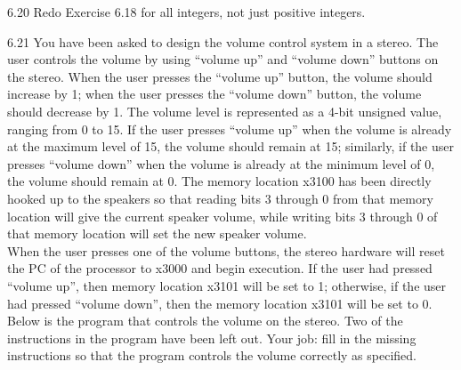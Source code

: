 \documentclass{patt}
\begin{document}
\begin{exercises}
\item[6.20] Redo Exercise 6.18 for all integers, not just positive integers.

\item[6.21] You have been asked to design the volume control system in a stereo. The user controls the volume by using “volume up” and “volume down” buttons on the stereo. When the user presses the “volume up” button, the volume should increase by 1; when the user presses the “volume down” button, the volume should decrease by 1. The volume level is represented as a 4-bit unsigned value, ranging from 0 to 15. If the user presses “volume up” when the volume is already at the maximum level of 15, the volume should remain at 15; similarly, if the user presses “volume down” when the volume is already at the minimum level of 0, the volume should remain at 0. The memory location x3100 has been directly hooked up to the speakers so that reading bits 3 through 0 from that memory location will give the current speaker volume, while writing bits 3 through 0 of that memory location will set the new speaker volume. \\

\noindent
When the user presses one of the volume buttons, the stereo hardware will reset the PC of the processor to x3000 and begin execution. If the user had pressed “volume up”, then memory location x3101 will be set to 1; otherwise, if the user had pressed “volume down”, then the memory location x3101 will be set to 0. \\

\noindent
Below is the program that controls the volume on the stereo. Two of the instructions in the program have been left out. Your job: fill in the missing instructions so that the program controls the volume correctly as specified. \\


\end{exercises}
\end{document}
